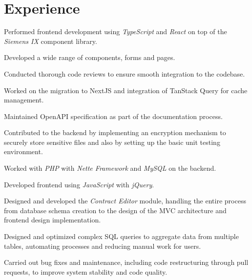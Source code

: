 \documentclass[]{deedy-resume-reversed}
\begin{document}
\begin{minipage}[t]{0.63\textwidth}


\section{Experience}
\vspace{\topsep} %
\begin{tightemize}
\item Performed frontend development using \emph{TypeScript} and \emph{React} on top of the \emph{Siemens IX} component library. 
\item Developed a wide range of components, forms and pages.
\item Conducted thorough code reviews to ensure smooth integration to the codebase. 
\item Worked on the migration to NextJS and integration of TanStack Query for cache management. 
\item Maintained OpenAPI specification as part of the documentation process. \item Contributed to the backend by implementing an encryption mechanism to securely store sensitive files and also by setting up the basic unit testing environment.
\end{tightemize}
\sectionsep

\begin{tightemize}
\item Worked with \emph{PHP} with \emph{Nette Framework} and \emph{MySQL} on the backend.
\item Developed frontend using \emph{JavaScript} with \emph{jQuery}.
\item Designed and developed the \emph{Contract Editor} module, handling the entire process from database schema creation to the design of the MVC architecture and frontend design implementation.
\item Designed and optimized complex SQL queries to aggregate data from multiple tables, automating processes and reducing manual work for users.
\item Carried out bug fixes and maintenance, including code restructuring through pull requests, to improve system stability and code quality.
\end{tightemize}
\sectionsep


\end{minipage}
\end{document}
